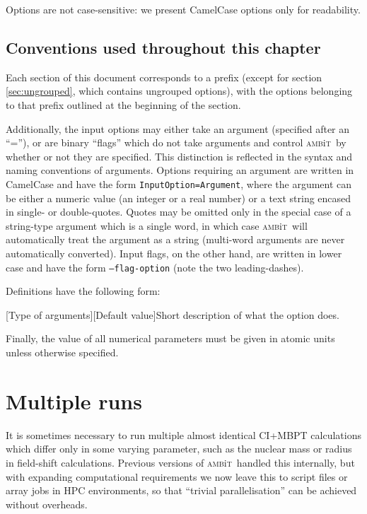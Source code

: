 \documentclass{report}
\newcommand{\ambit}{\textsc{amb}{\footnotesize i}\textsc{t}}
\begin{document}
Options are not case-sensitive: we present CamelCase options only for readability.

\subsection{Conventions used throughout this chapter}

Each section of this document corresponds to a prefix (except for section \ref{sec:ungrouped}, which
contains ungrouped options), with the options belonging to that prefix outlined at the beginning of the
section. 

Additionally, the input options may either take an argument (specified after an ``=''), or are binary
``flags'' which do not take arguments and control \ambit\ by whether or not they are specified. This
distinction is reflected in the syntax and naming conventions of arguments. Options requiring an
argument are written in CamelCase and have the form \texttt{InputOption=Argument}, where the argument
can be either a numeric value (an integer or a real number) or a text string encased in single- or
double-quotes. Quotes may be omitted only in the special case of a string-type argument which is a
single word, in which case \ambit\ will automatically treat the argument as a string (multi-word
arguments are never automatically converted). Input flags, on the other hand, are written in lower case 
and have the form \texttt{--flag-option} (note the two leading-dashes). 

Definitions have the following form:

[Type of arguments][Default value]{Short description of what the option does.}

Finally, the value of all numerical parameters must be given in atomic units unless otherwise specified.

\section{Multiple runs}

\label{sec:multirun}

It is sometimes necessary to run multiple almost identical CI+MBPT calculations which differ only in
some varying parameter, such as the nuclear mass or radius in field-shift calculations. Previous versions of \ambit\ handled this internally, but with expanding computational requirements we now leave this to script files or array jobs in HPC environments, so that ``trivial parallelisation'' can be achieved without overheads.
\end{document}
